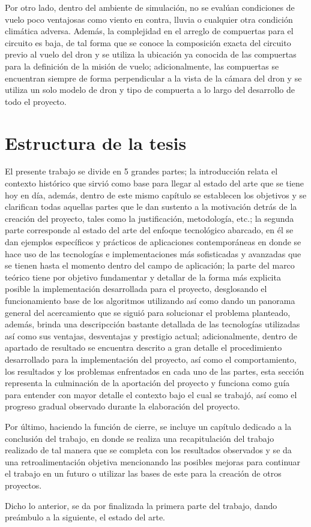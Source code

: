 Por otro lado, dentro del ambiente de simulación, no se evalúan condiciones de vuelo poco ventajosas como viento en contra, lluvia o cualquier otra condición climática adversa. Además, la complejidad en el arreglo de compuertas para el circuito es baja, de tal forma que se conoce la composición exacta del circuito previo al vuelo del dron y se utiliza la ubicación ya conocida de las compuertas para la definición de la misión de vuelo; adicionalmente, las compuertas se encuentran siempre de forma perpendicular a la vista de la cámara del dron y se utiliza un solo modelo de dron y tipo de compuerta a lo largo del desarrollo de todo el proyecto.


\section{Estructura de la tesis}
El presente trabajo se divide en 5 grandes partes; la introducción relata el contexto histórico que sirvió como base para llegar al estado del arte que se tiene hoy en día, además, dentro de este mismo capítulo se establecen los objetivos y se clarifican todas aquellas partes que le dan sustento a la motivación detrás de la creación del proyecto, tales como la justificación, metodología, etc.; la segunda parte corresponde al estado del arte del enfoque tecnológico abarcado, en él se dan ejemplos específicos y prácticos de aplicaciones contemporáneas en donde se hace uso de las tecnologías e implementaciones más sofisticadas y avanzadas que se tienen hasta el momento dentro del campo de aplicación; la parte del marco teórico tiene por objetivo fundamentar y detallar de la forma más explicita posible la implementación desarrollada para el proyecto, desglosando el funcionamiento base de los algoritmos utilizando así como dando un panorama general del acercamiento que se siguió para solucionar el problema planteado, además, brinda una descripcción bastante detallada de las tecnologías utilizadas así como sus ventajas, desventajas y prestigio actual; adicionalmente, dentro de apartado de resultado se encuentra descrito a gran detalle el procedimiento desarrollado para la implementación del proyecto, así como el comportamiento, los resultados y los problemas enfrentados en cada uno de las partes, esta sección representa la culminación de la aportación del proyecto y funciona como guía para entender con mayor detalle el contexto bajo el cual se trabajó, así como el progreso gradual observado durante la elaboración del proyecto.

Por último, haciendo la función de cierre, se incluye un capítulo dedicado a la conclusión del trabajo, en donde se realiza una recapitulación del trabajo realizado de tal manera que se completa con los resultados observados y se da una retroalimentación objetiva mencionando las posibles mejoras para continuar el trabajo en un futuro o utilizar las bases de este para la creación de otros proyectos.

Dicho lo anterior, se da por finalizada la primera parte del trabajo, dando preámbulo a la siguiente, el estado del arte.